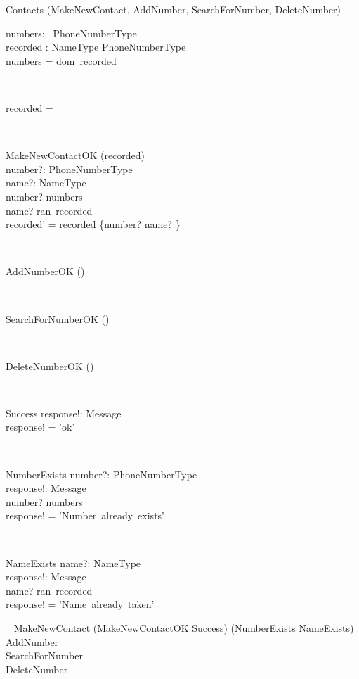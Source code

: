 \begin{class}{Contacts}
\also
\upharpoonright (MakeNewContact, AddNumber, SearchForNumber, DeleteNumber) \\
\begin{state}
numbers: ~PhoneNumberType\\
recorded : NameType \pfun PhoneNumberType\\
\where
numbers = dom~recorded
\end{state} \\
\begin{init}
recorded = \emptyset %
\end{init} \\
\begin{op}{MakeNewContactOK}
\Delta (recorded) \\
number?: PhoneNumberType \\
name?: NameType \\
\ST
number? \notin numbers \\
name? \notin ran~recorded \\
recorded' = recorded \cup \{number? \mapsto name? \}
\end{op}\\
\begin{op}{AddNumberOK}
\Delta () \\
\ST
\end{op}\\
\begin{op}{SearchForNumberOK}
\Delta () \\
\ST
\end{op}\\
\begin{op}{DeleteNumberOK}
\Delta () \\
\ST
\end{op}\\
\begin{op}{Success}
response!: Message \\
\ST
response! = 'ok'
\end{op}\\
\begin{op}{NumberExists}
number?: PhoneNumberType \\
response!: Message \\
\ST
number? \in numbers \\
response! = 'Number~already~exists'
\end{op}\
\zbreak
\begin{op}{NameExists}
name?: NameType \\
response!: Message \\
\ST
name? \in ran~recorded \\
response! = 'Name~already~taken'
\end{op}\
\also
MakeNewContact \sdef (MakeNewContactOK \wedge Success) \oplus (NumberExists \lor NameExists) \\
AddNumber \sdef \\
SearchForNumber \sdef \\
DeleteNumber \sdef
\end{class}